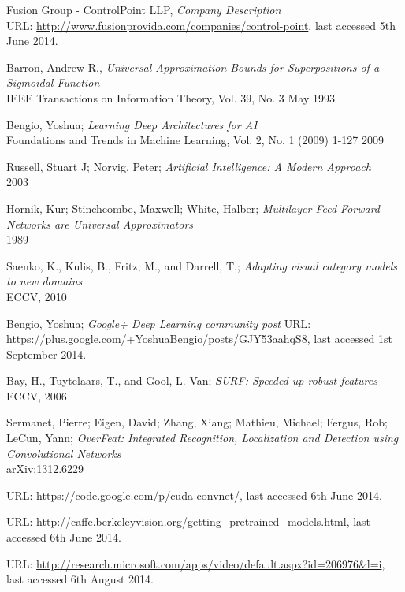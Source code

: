 \documentclass[a4paper,11pt]{article}
\begin{document}
\begin{thebibliography}{1}
 Fusion Group - ControlPoint LLP,
 \emph{Company Description}\\
 URL: \url{http://www.fusionprovida.com/companies/control-point}, last accessed 5th June 2014. 
  
 Barron, Andrew R.,
 \emph{Universal Approximation Bounds for Superpositions of a Sigmoidal Function}\\
 IEEE Transactions on Information Theory, 
 Vol. 39, No. 3
 May 1993

 Bengio, Yoshua;
 \emph{Learning Deep Architectures for AI}\\
 Foundations and Trends in Machine Learning, 
 Vol. 2, No. 1 (2009) 1-127
 2009

 Russell, Stuart J; Norvig, Peter;
 \emph{Artificial Intelligence: A Modern Approach}\\
 2003

 Hornik, Kur; Stinchcombe, Maxwell; White, Halber;
 \emph{Multilayer Feed-Forward Networks are Universal Approximators}\\
 1989

 Saenko, K., Kulis, B., Fritz, M., and Darrell, T.;
 \emph{Adapting visual category models to new domains}\\
 ECCV, 2010

 Bengio, Yoshua;
 \emph{Google+ Deep Learning community post}
 URL: \url{https://plus.google.com/+YoshuaBengio/posts/GJY53aahqS8}, last accessed 1st September 2014.
 
 Bay, H., Tuytelaars, T., and Gool, L. Van;
 \emph{SURF: Speeded up robust features}\\
 ECCV, 2006

 Sermanet, Pierre; Eigen, David; Zhang, Xiang; Mathieu, Michael; Fergus, Rob; LeCun, Yann;
 \emph{OverFeat: Integrated Recognition, Localization and Detection using Convolutional Networks}\\
 arXiv:1312.6229
  
 
 URL: \url{https://code.google.com/p/cuda-convnet/}, last accessed 6th June 2014.

 URL: \url{http://caffe.berkeleyvision.org/getting_pretrained_models.html}, last accessed 6th June 2014.

 URL: \url{http://research.microsoft.com/apps/video/default.aspx?id=206976&l=i}, last accessed 6th August 2014.


\end{thebibliography}
\end{document}
